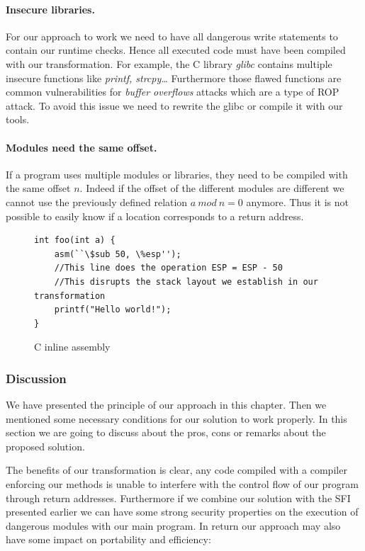 \documentclass[11pt]{sdm}
\begin{document}
\paragraph{Insecure libraries.}
\label{par:Insecure libraries}

For our approach to work we need to have all dangerous write statements to contain our runtime checks. Hence all executed code must have been compiled with our transformation. For example, the C library \textit{glibc} contains multiple insecure functions like \textit{printf, strcpy\dots} Furthermore those flawed functions are common vulnerabilities for \textit{buffer overflows} attacks which are a type of ROP attack. To avoid this issue we need to rewrite the glibc or compile it with our tools.

\paragraph{Modules need the same offset.}
\label{par:Modules need the same offset}
If a program uses multiple modules or libraries, they need to be compiled with the same offset $n$. Indeed if the offset of the different modules are different we cannot use the previously defined relation $a~mod~n=0$ anymore. Thus it is not possible to easily know if a location corresponds to a return address.

\begin{figure}[!ht]
\begin{lstlisting}
int foo(int a) {
	asm(``\$sub 50, \%esp'');
	//This line does the operation ESP = ESP - 50
	//This disrupts the stack layout we establish in our transformation
	printf("Hello world!");
}
\end{lstlisting}
\centering
\caption{C inline assembly}
\label{inline_assembly}
\end{figure}

\subsubsection{Discussion}
\label{ssub:Discussion}
	We have presented the principle of our approach in this chapter. Then we mentioned some necessary conditions for our solution to work properly. In this section we are going to discuss about the pros, cons or remarks about the proposed solution.

	The benefits of our transformation is clear, any code compiled with a compiler enforcing our methods is unable to interfere with the control flow of our program through return addresses.
	Furthermore if we combine our solution with the SFI presented earlier we can have some strong security properties on the execution of dangerous modules with our main program.
In return our approach may also have some impact on portability and efficiency:
\end{document}
